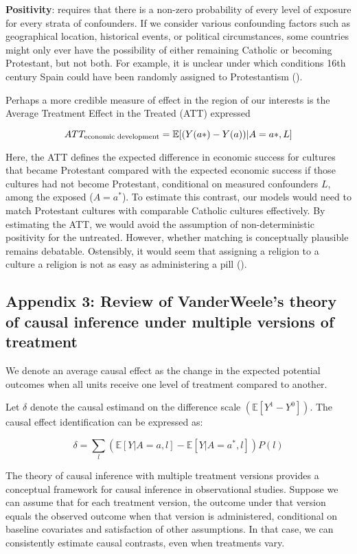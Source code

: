 \documentclass[
  singlecolumn,
  9pt]{article}
\begin{document}
\textbf{Positivity}: requires that there is a non-zero probability of
every level of exposure for every strata of confounders. If we consider
various confounding factors such as geographical location, historical
events, or political circumstances, some countries might only ever have
the possibility of either remaining Catholic or becoming Protestant, but
not both. For example, it is unclear under which conditions 16th century
Spain could have been randomly assigned to Protestantism
().

Perhaps a more credible measure of effect in the region of our interests
is the Average Treatment Effect in the Treated (ATT) expressed

\[ATT_{\textnormal{economic~development}} = \mathbb{E}[(Y(a*)- Y(a))|A = a*,L]\]

Here, the ATT defines the expected difference in economic success for
cultures that became Protestant compared with the expected economic
success if those cultures had not become Protestant, conditional on
measured confounders \(L\), among the exposed (\(A = a^*\)). To estimate
this contrast, our models would need to match Protestant cultures with
comparable Catholic cultures effectively. By estimating the ATT, we
would avoid the assumption of non-deterministic positivity for the
untreated. However, whether matching is conceptually plausible remains
debatable. Ostensibly, it would seem that assigning a religion to a
culture a religion is not as easy as administering a pill
().

\subsection{Appendix 3: Review of VanderWeele's theory of causal
inference under multiple versions of
treatment}\label{appendix-3-review-of-vanderweeles-theory-of-causal-inference-under-multiple-versions-of-treatment}

We denote an average causal effect as the change in the expected
potential outcomes when all units receive one level of treatment
compared to another.

Let \(\delta\) denote the causal estimand on the difference scale
\((\mathbb{E}[Y^1 - Y^0])\). The causal effect identification can be
expressed as:

\[ \delta = \sum_l \left( \mathbb{E}[Y|A=a,l] - \mathbb{E}[Y|A=a^*,l] \right) P(l)\]

The theory of causal inference with multiple treatment versions provides
a conceptual framework for causal inference in observational studies.
Suppose we can assume that for each treatment version, the outcome under
that version equals the observed outcome when that version is
administered, conditional on baseline covariates and satisfaction of
other assumptions. In that case, we can consistently estimate causal
contrasts, even when treatments vary.
\end{document}

